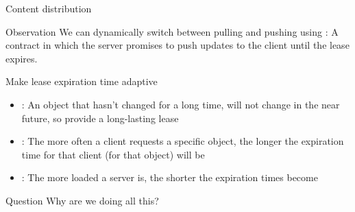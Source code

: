 \begin{slide}{Content distribution}
  \vspace*{-6pt}
  \begin{block}{Observation} 
    We can dynamically switch between pulling and pushing using : A contract in which the server
    promises to push updates to the client until the lease expires.
  \end{block}
  \begin{alertblock}{Make lease expiration time adaptive}
    \begin{itemize}
    \item<2,5> : An object that hasn't changed for a long time, will not change in the near
      future, so provide a long-lasting lease
    \item<3,5> : The more often a client requests a specific object, the longer
      the expiration time for that client (for that object) will be
    \item<4,5> : The more loaded a server is, the shorter the expiration times become
    \end{itemize}
  \end{alertblock}
  \begin{alertblock}{Question}
    Why are we doing all this?  
  \end{alertblock}
\end{slide}

